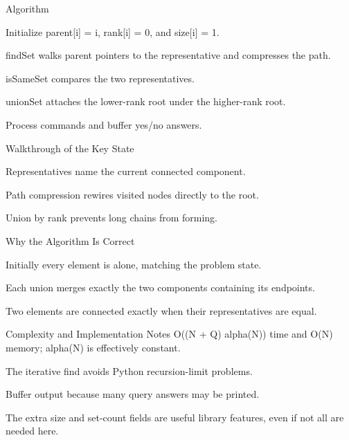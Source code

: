 \documentclass[aspectratio=169,11pt]{beamer}
\begin{document}
\begin{frame}{Algorithm}
\begin{tightitemize}
  \item Initialize parent[i] = i, rank[i] = 0, and size[i] = 1.
  \item findSet walks parent pointers to the representative and compresses the path.
  \item isSameSet compares the two representatives.
  \item unionSet attaches the lower-rank root under the higher-rank root.
  \item Process commands and buffer yes/no answers.
\end{tightitemize}
\end{frame}

\begin{frame}{Walkthrough of the Key State}
\begin{tightitemize}
  \item Representatives name the current connected component.
  \item Path compression rewires visited nodes directly to the root.
  \item Union by rank prevents long chains from forming.
\end{tightitemize}
\end{frame}

\begin{frame}{Why the Algorithm Is Correct}
\begin{tightitemize}
  \item Initially every element is alone, matching the problem state.
  \item Each union merges exactly the two components containing its endpoints.
  \item Two elements are connected exactly when their representatives are equal.
\end{tightitemize}
\end{frame}

\begin{frame}{Complexity and Implementation Notes}
\small
{} O((N + Q) alpha(N)) time and O(N) memory; alpha(N) is effectively constant.

\vspace{0.3cm}
\begin{tightitemize}
  \item The iterative find avoids Python recursion-limit problems.
  \item Buffer output because many query answers may be printed.
  \item The extra size and set-count fields are useful library features, even if not all are needed here.
\end{tightitemize}
\end{frame}
\end{document}
